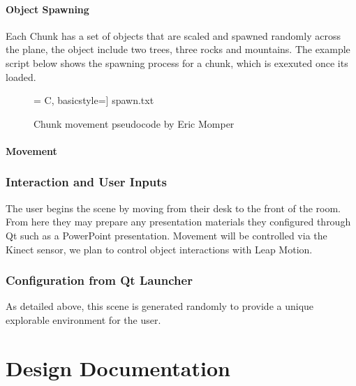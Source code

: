 \documentclass[a4paper,10pt]{article}
\begin{document}
\paragraph{Object Spawning}
Each Chunk has a set of objects that are scaled and spawned randomly across the plane, the object include two trees, three rocks and mountains. The example script below shows the spawning process for a chunk, which is exexuted once its loaded. 
\begin{figure}[H]
	\centerline{ = C, basicstyle=\small] {spawn.txt}}
	\label{fig:terrainMoveCode}
	\caption{Chunk movement pseudocode by Eric Momper}
\end{figure}


\paragraph{Movement}



\subsubsection{Interaction and User Inputs}
The user begins the scene by moving from their desk to the front of the room. From here they may prepare any presentation materials they configured through Qt such as a PowerPoint presentation. Movement will be controlled via the Kinect sensor, we plan to control object interactions with Leap Motion. 

\subsubsection{Configuration from Qt Launcher}
As detailed above, this scene is generated randomly to provide a unique explorable environment for the user.
\pagebreak

\section{Design Documentation}
\end{document}

